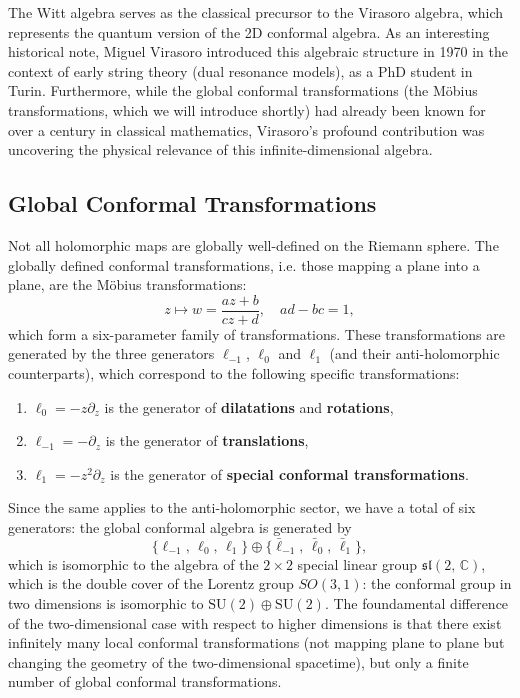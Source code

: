 The Witt algebra serves as the classical precursor to the Virasoro algebra, which represents the quantum version of the 2D conformal algebra. As an interesting historical note, Miguel Virasoro introduced this algebraic structure in 1970 in the context of early string theory (dual resonance models), as a PhD student in Turin. Furthermore, while the global conformal transformations (the Möbius transformations, which we will introduce shortly) had already been known for over a century in classical mathematics, Virasoro's profound contribution was uncovering the physical relevance of this infinite-dimensional algebra.

\subsection{Global Conformal Transformations}

Not all holomorphic maps are globally well-defined on the Riemann sphere. The globally defined conformal transformations, i.e. those mapping a plane into a plane, are the Möbius transformations:
\begin{equation}
    z \mapsto w = \frac{az + b}{cz + d}, \quad ad - bc = 1,
    \label{eq:mobius_transformations}
\end{equation}
which form a six-parameter family of transformations. These transformations are generated by the three generators \(\ell_{-1}\), \(\ell_0\) and \(\ell_1\) (and their anti-holomorphic counterparts), which correspond to the following specific transformations:
\begin{enumerate}
    \item \(\ell_0 = -z \partial_z\) is the generator of \textbf{dilatations} and \textbf{rotations},
    \item \(\ell_{-1} = -\partial_z\) is the generator of \textbf{translations},
    \item \(\ell_1 = -z^2 \partial_z\) is the generator of \textbf{special conformal transformations}.
\end{enumerate}
Since the same applies to the anti-holomorphic sector, we have a total of six generators: the global conformal algebra is generated by
\begin{equation}
    \{\ell_{-1},\, \ell_0,\, \ell_1\} \oplus \{\bar{\ell}_{-1},\, \bar{\ell}_0,\, \bar{\ell}_1\},
    \label{eq:global_conformal_generators}
\end{equation}
which is isomorphic to the algebra of the \(2\times 2\) special linear group \(\mathfrak{sl}(2, \, \mathbb{C})\), which is the double cover of the Lorentz group \(SO(3,1)\): the conformal group in two dimensions is isomorphic to \(\mathrm{SU}(2) \oplus \mathrm{SU}(2)\). The foundamental difference of the two-dimensional case with respect to higher dimensions is that there exist infinitely many local conformal transformations (not mapping plane to plane but changing the geometry of the two-dimensional spacetime), but only a finite number of global conformal transformations.

